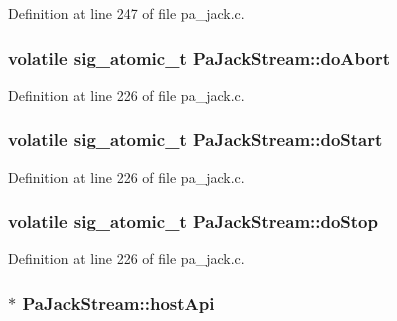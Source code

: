 Definition at line 247 of file pa\+\_\+jack.\+c.

\subsubsection[{\texorpdfstring{do\+Abort}{doAbort}}]{\setlength{\rightskip}{0pt plus 5cm}volatile sig\+\_\+atomic\+\_\+t Pa\+Jack\+Stream\+::do\+Abort}\hypertarget{struct_pa_jack_stream_aead1d117bea0ff3b76f87f3a6ebd60fd}{}\label{struct_pa_jack_stream_aead1d117bea0ff3b76f87f3a6ebd60fd}


Definition at line 226 of file pa\+\_\+jack.\+c.

\subsubsection[{\texorpdfstring{do\+Start}{doStart}}]{\setlength{\rightskip}{0pt plus 5cm}volatile sig\+\_\+atomic\+\_\+t Pa\+Jack\+Stream\+::do\+Start}\hypertarget{struct_pa_jack_stream_aa9795c7296b5f4980026cc2878d64790}{}\label{struct_pa_jack_stream_aa9795c7296b5f4980026cc2878d64790}


Definition at line 226 of file pa\+\_\+jack.\+c.

\subsubsection[{\texorpdfstring{do\+Stop}{doStop}}]{\setlength{\rightskip}{0pt plus 5cm}volatile sig\+\_\+atomic\+\_\+t Pa\+Jack\+Stream\+::do\+Stop}\hypertarget{struct_pa_jack_stream_a2c8bcb554717b9274982084fb5ed0664}{}\label{struct_pa_jack_stream_a2c8bcb554717b9274982084fb5ed0664}


Definition at line 226 of file pa\+\_\+jack.\+c.

\subsubsection[{\texorpdfstring{host\+Api}{hostApi}}]{$\ast$ Pa\+Jack\+Stream\+::host\+Api}\hypertarget{struct_pa_jack_stream_a23621ea90d67d042879358448ad6aca2}{}\label{struct_pa_jack_stream_a23621ea90d67d042879358448ad6aca2}


